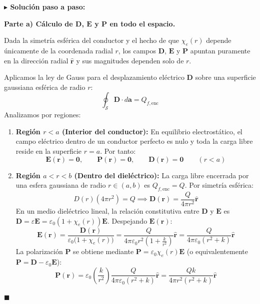 \documentclass[11pt,a4paper]{book}
\newenvironment{solucion}{%
    \par\medskip\noindent\textbf{\color{blue!65!black}\Large $\blacktriangleright$ Solución paso a paso:}\par\medskip
}{%
    \hfill$\blacksquare$\par\bigskip
}
\newcommand{\rhat}{\hat{\bm{r}}}
\newcommand{\Evec}{\bm{E}}
\newcommand{\Dvec}{\bm{D}}
\newcommand{\Pvec}{\bm{P}}
\begin{document}
\begin{solucion}
\textbf{Parte a) Cálculo de $\Dvec$, $\Evec$ y $\Pvec$ en todo el espacio.}

Dada la simetría esférica del conductor y el hecho de que $\chi_e(r)$ depende únicamente de la coordenada radial $r$, los campos $\Dvec$, $\Evec$ y $\Pvec$ apuntan puramente en la dirección radial $\rhat$ y sus magnitudes dependen solo de $r$.

Aplicamos la ley de Gauss para el desplazamiento eléctrico $\Dvec$ sobre una superficie gaussiana esférica de radio $r$:
\begin{equation}
    \oint_{\mathcal{S}} \Dvec \cdot d\bm{a} = Q_{f,\text{enc}}
\end{equation}
Analizamos por regiones:
\begin{enumerate}[label=\roman*)]
    \item \textbf{Región $r < a$ (Interior del conductor):}
    En equilibrio electrostático, el campo eléctrico dentro de un conductor perfecto es nulo y toda la carga libre reside en la superficie $r=a$. Por tanto:
    \begin{equation}
        \Evec(\bm{r}) = \bm{0}, \qquad \Pvec(\bm{r}) = \bm{0}, \qquad \Dvec(\bm{r}) = \bm{0} \qquad (r < a)
    \end{equation}

    \item \textbf{Región $a < r < b$ (Dentro del dieléctrico):}
    La carga libre encerrada por una esfera gaussiana de radio $r \in (a,b)$ es $Q_{f,\text{enc}} = Q$. Por simetría esférica:
    \begin{equation}
        D(r) (4\pi r^2) = Q \implies \Dvec(\bm{r}) = \frac{Q}{4\pi r^2}\rhat
    \end{equation}
    En un medio dieléctrico lineal, la relación constitutiva entre $\Dvec$ y $\Evec$ es $\Dvec = \varepsilon\Evec = \varepsilon_0(1 + \chi_e(r))\Evec$. Despejando $\Evec(\bm{r})$:
    \begin{equation}
        \Evec(\bm{r}) = \frac{\Dvec(\bm{r})}{\varepsilon_0\big(1 + \chi_e(r)\big)} = \frac{Q}{4\pi\varepsilon_0 r^2 \left(1 + \frac{k}{r^2}\right)}\rhat = \frac{Q}{4\pi\varepsilon_0 (r^2 + k)}\rhat
    \end{equation}
    La polarización $\Pvec$ se obtiene mediante $\Pvec = \varepsilon_0 \chi_e(r) \Evec$ (o equivalentemente $\Pvec = \Dvec - \varepsilon_0\Evec$):
    \begin{equation}
        \Pvec(\bm{r}) = \varepsilon_0 \left(\frac{k}{r^2}\right) \frac{Q}{4\pi\varepsilon_0 (r^2 + k)}\rhat = \frac{Q k}{4\pi r^2 (r^2 + k)}\rhat
    \end{equation}


\end{enumerate}
\end{solucion}
\end{document}
